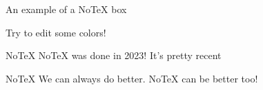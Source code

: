 \begin{example}
    An example of a NoTeX box
\end{example}

\begin{exercise}
    Try to edit some colors!
\end{exercise}

\begin{curiosity}{NoTeX}
    NoTeX was done in 2023! It's pretty recent
\end{curiosity}

\begin{remark}{NoTeX}
    We can always do better. NoTeX can be better too!
\end{remark}
